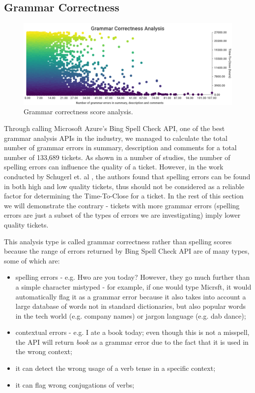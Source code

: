 \documentclass{mpaper}
\begin{document}
\subsection{Grammar Correctness}

\begin{figure}[ht]
  \begin{center}
    \includegraphics[scale=0.23]{images/grammar_correctness.png}
  \end{center}
  \caption{\label{grammar}Grammar correctness score analysis.}
\end{figure}

Through calling Microsoft Azure's Bing Spell Check API, one of the best grammar analysis APIs in the industry, we 
managed to calculate the total number of grammar errors in summary, description and comments for a total number 
of 133,689 tickets. As shown in a number of studies, the number of spelling errors can influence the quality of a ticket. 
However, in the work conducted by Schugerl et. al \cite{schugerl2008mining}, the authors found that spelling errors 
can be found in both high and low quality tickets, thus should not be considered as a reliable factor for determining
the Time-To-Close for a ticket. In the rest of this section we will demonstrate the contrary - tickets with more 
grammar errors (spelling errors are just a subset of the types of errors we are investigating) imply lower quality
tickets. 

This analysis type is called grammar correctness rather than spelling scores because the range of errors returned 
by Bing Spell Check API are of many types, some of which are:
\begin{itemize}
  \item spelling errors - e.g. Hwo are you today? However, they go much further than a simple character mistyped - for example,
  if one would type Micrsft, it would automatically flag it as a grammar error because it also takes into account a large 
  database of words not in standard dictionaries, but also popular words in the tech world (e.g. company names) or 
  jargon language (e.g. dab dance);
  \item contextual errors - e.g. I ate a book today; even though this is not a misspell, the API will return \emph{book} as 
  a grammar error due to the fact that it is used in the wrong context;
  \item it can detect the wrong usage of a verb tense in a specific context;
  \item it can flag wrong conjugations of verbs;
\end{itemize}
\end{document}
